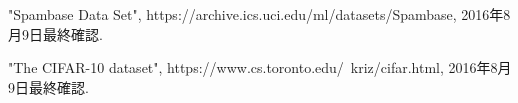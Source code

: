 \documentclass[a4paper,12pt]{jarticle}
\begin{document}
\begin{thebibliography}{99}

  "Spambase Data Set",
		 https://archive.ics.uci.edu/ml/datasets/Spambase, 2016年8月9日最終確認.

  "The CIFAR-10 dataset",
		 https://www.cs.toronto.edu/~kriz/cifar.html, 2016年8月9日最終確認.

\end{thebibliography}
\end{document}
